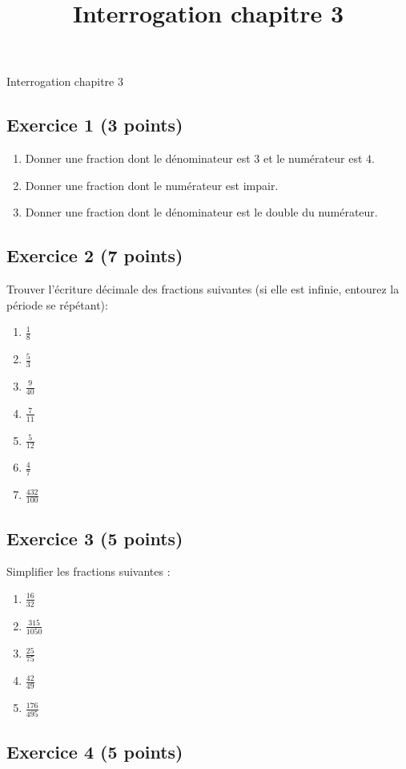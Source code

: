 \documentclass[14 pt]{extarticle}
\title{Interrogation chapitre 3}
\date{}
\theoremstyle{plain}
\begin{document}
\begin{center}{\Large Interrogation chapitre 3}\\ 
 \end{center}
 \subsection*{Exercice 1 (3 points)}
 
 \begin{enumerate}
 \item Donner une fraction dont le dénominateur est $3$ et le numérateur est $4$. 
 \item Donner une fraction dont le numérateur est impair. 
 \item Donner une fraction dont le dénominateur est le double du numérateur. 
 \end{enumerate}
 
 \subsection*{Exercice 2 (7 points)}
Trouver l'écriture décimale des fractions suivantes (si elle est infinie, entourez la période se répétant): 
\begin{enumerate}
\item $\frac18$
\item $\frac53$
\item $\frac{9}{40}$
\item $\frac7{11}$
\item $\frac5{12}$
\item $\frac47$
\item $\frac{432}{100}$
\end{enumerate}
 \subsection*{Exercice 3 (5 points)}
 
 Simplifier les fractions suivantes : 
 \begin{enumerate}
 \item $\frac{16}{32}$
 \item $\frac{315}{1050}$
 \item $\frac{25}{75}$
 \item $\frac{42}{49}$
 \item $\frac{176}{495}$
 \end{enumerate}
 
 
 \subsection*{Exercice 4 (5 points)}
 
\end{document}
